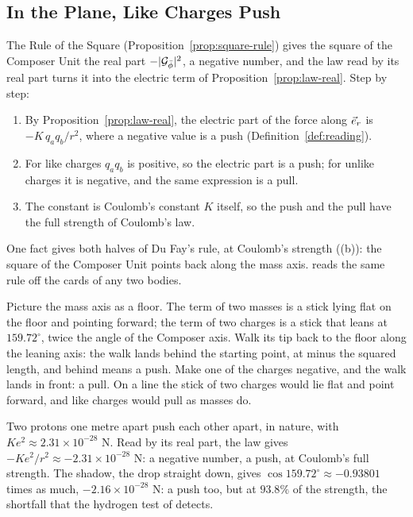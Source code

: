 \subsection{In the Plane, Like Charges Push}\label{subsec:why-doubles}

The Rule of the Square (Proposition~\ref{prop:square-rule}) gives the square of the Composer Unit the real part $-|\mathcal{G}_{\bar{\phi}}|^2$, a negative number, and the law read by its real part turns it into the electric term of Proposition~\ref{prop:law-real}. Step by step:
\begin{enumerate}
  \item By Proposition~\ref{prop:law-real}, the electric part of the force along $\vec{e}_r$ is $-K\,q_a q_b/r^2$, where a negative value is a push (Definition~\ref{def:reading}).
  \item For like charges $q_a q_b$ is positive, so the electric part is a push; for unlike charges it is negative, and the same expression is a pull.
  \item The constant is Coulomb's constant $K$ itself, so the push and the pull have the full strength of Coulomb's law.
\end{enumerate}
One fact gives both halves of Du Fay's rule, at Coulomb's strength ((b)): the square of the Composer Unit points back along the mass axis.  reads the same rule off the cards of any two bodies.

\begin{plainwords}
Picture the mass axis as a floor. The term of two masses is a stick lying flat on the floor and pointing forward; the term of two charges is a stick that leans at $159.72^\circ$, twice the angle of the Composer axis. Walk its tip back to the floor along the leaning axis: the walk lands behind the starting point, at minus the squared length, and behind means a push. Make one of the charges negative, and the walk lands in front: a pull. On a line the stick of two charges would lie flat and point forward, and like charges would pull as masses do.
\end{plainwords}

\begin{workedexample}
Two protons one metre apart push each other apart, in nature, with $K e^2 \approx 2.31 \times 10^{-28}$ N. Read by its real part, the law gives $-K e^2/r^2 \approx -2.31 \times 10^{-28}$ N: a negative number, a push, at Coulomb's full strength. The shadow, the drop straight down, gives $\cos 159.72^\circ \approx -0.93801$ times as much, $-2.16 \times 10^{-28}$ N: a push too, but at $93.8\%$ of the strength, the shortfall that the hydrogen test of  detects.
\end{workedexample}

